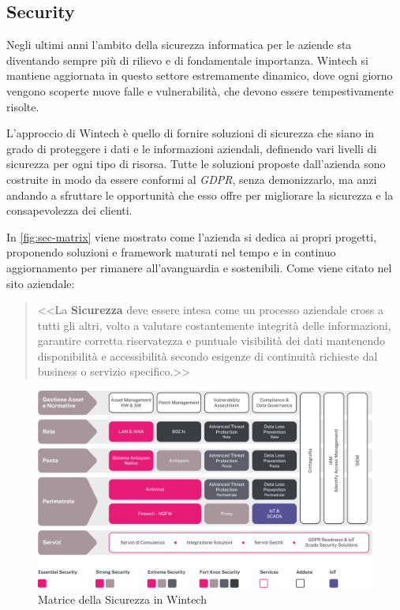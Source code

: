\subsection{Security}
\label{sez:azienda-security}

Negli ultimi anni l'ambito della sicurezza informatica per le aziende sta diventando sempre più di rilievo e di fondamentale importanza. Wintech si mantiene aggiornata in questo settore estremamente dinamico, dove ogni giorno vengono scoperte nuove falle e vulnerabilità, che devono essere tempestivamente risolte.

L'approccio di Wintech è quello di fornire soluzioni di sicurezza che siano in grado di proteggere i dati e le informazioni aziendali, definendo vari livelli di sicurezza per ogni tipo di risorsa. Tutte le soluzioni proposte dall'azienda sono costruite in modo da essere conformi al \emph{GDPR}, senza demonizzarlo, ma anzi andando a sfruttare le opportunità che esso offre per migliorare la sicurezza e la consapevolezza dei clienti.

In \autoref{fig:sec-matrix} viene mostrato come l'azienda si dedica ai propri progetti, proponendo soluzioni e framework maturati nel tempo e in continuo aggiornamento per rimanere all'avanguardia e sostenibili. Come viene citato nel sito aziendale:
\begin{quotation}
    <<La \textbf{Sicurezza} deve essere intesa come un processo aziendale cross a tutti gli altri, volto a valutare costantemente integrità delle informazioni, garantire corretta riservatezza e puntuale visibilità dei dati mantenendo disponibilità e accessibilità secondo esigenze di continuità richieste dal business o servizio specifico.>> \cite{site:wtc-security}
\end{quotation}

\begin{figure}[htbp]
    \centering
    \includegraphics[width=0.9\linewidth]{images/wtc/sec-matrix.png}
    \caption{Matrice della Sicurezza in Wintech}
    \label{fig:sec-matrix}
\end{figure}

